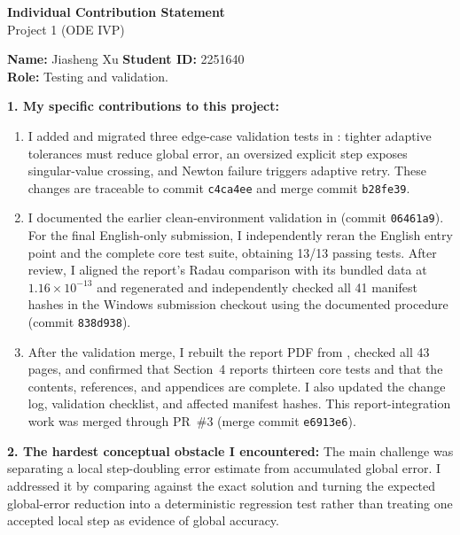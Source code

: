 \documentclass[10pt]{article}
\begin{document}
\begin{center}
    {\Large\bfseries Individual Contribution Statement}\\[0.2em]
    {\large Project 1 (ODE IVP)}
\end{center}

\begin{formbox}
\textbf{Name:} Jiasheng Xu \hfill \textbf{Student ID:} 2251640\\
\textbf{Role:} Testing and validation.

\textbf{1. My specific contributions to this project:}
\begin{enumerate}[leftmargin=2em,itemsep=0.25em,topsep=0.15em]
    \item I added and migrated three edge-case validation tests in
    : tighter adaptive tolerances must
    reduce global error, an oversized explicit step exposes singular-value
    crossing, and Newton failure triggers adaptive retry.  These changes are
    traceable to commit \texttt{c4ca4ee} and merge commit \texttt{b28fe39}.

    \item I documented the earlier clean-environment validation in
    (commit \texttt{06461a9}).  For the final English-only submission, I
    independently reran the English entry point and the complete core test
    suite, obtaining 13/13 passing tests.  After review, I aligned the report's
    Radau comparison with its bundled data at \(1.16\times10^{-13}\) and
    regenerated and independently checked all 41 manifest hashes in the
    Windows submission checkout using the documented procedure (commit
    \texttt{838d938}).

    \item After the validation merge, I rebuilt the report PDF from
    , checked all 43 pages, and confirmed
    that Section~4 reports thirteen core tests and that the contents, references,
    and appendices are complete.  I also updated the change log, validation
    checklist, and affected manifest hashes.  This report-integration work was
    merged through PR~\#3 (merge commit \texttt{e6913e6}).
\end{enumerate}

\textbf{2. The hardest conceptual obstacle I encountered:} The main challenge
was separating a local step-doubling error estimate from accumulated global
error.  I addressed it by comparing against the exact solution and turning the
expected global-error reduction into a deterministic regression test rather
than treating one accepted local step as evidence of global accuracy.


\end{formbox}
\end{document}
